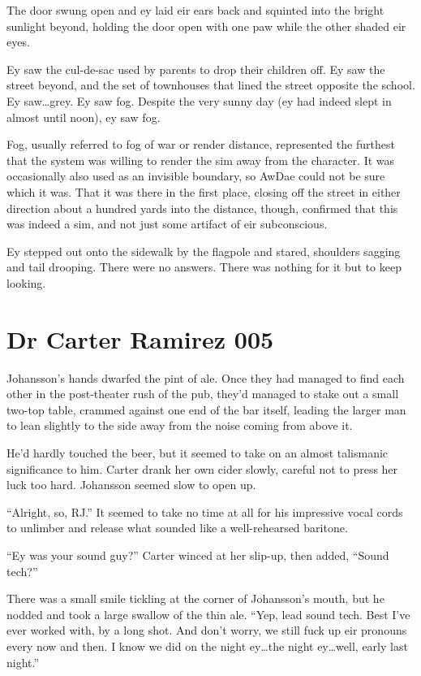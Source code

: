 The door swung open and ey laid eir ears back and squinted into the bright sunlight beyond, holding the door open with one paw while the other shaded eir eyes.

Ey saw the cul-de-sac used by parents to drop their children off. Ey saw the street beyond, and the set of townhouses that lined the street opposite the school. Ey saw\ldots{}grey. Ey saw fog. Despite the very sunny day (ey had indeed slept in almost until noon), ey saw fog.

Fog, usually referred to fog of war or render distance, represented the furthest that the system was willing to render the sim away from the character. It was occasionally also used as an invisible boundary, so AwDae could not be sure which it was. That it was there in the first place, closing off the street in either direction about a hundred yards into the distance, though, confirmed that this was indeed a sim, and not just some artifact of eir subconscious.

Ey stepped out onto the sidewalk by the flagpole and stared, shoulders sagging and tail drooping. There were no answers. There was nothing for it but to keep looking.

\chapter*{Dr Carter Ramirez 005}

Johansson's hands dwarfed the pint of ale. Once they had managed to find each other in the post-theater rush of the pub, they'd managed to stake out a small two-top table, crammed against one end of the bar itself, leading the larger man to lean slightly to the side away from the noise coming from above it.

He'd hardly touched the beer, but it seemed to take on an almost talismanic significance to him. Carter drank her own cider slowly, careful not to press her luck too hard. Johansson seemed slow to open up.

``Alright, so, RJ.'' It seemed to take no time at all for his impressive vocal cords to unlimber and release what sounded like a well-rehearsed baritone.

``Ey was your sound guy?'' Carter winced at her slip-up, then added, ``Sound tech?''

There was a small smile tickling at the corner of Johansson's mouth, but he nodded and took a large swallow of the thin ale. ``Yep, lead sound tech. Best I've ever worked with, by a long shot. And don't worry, we still fuck up eir pronouns every now and then. I know we did on the night ey\ldots{}the night ey\ldots{}well, early last night.''

